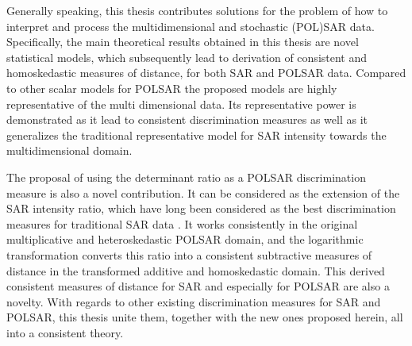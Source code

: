 Generally speaking, this thesis contributes solutions for the problem of how to interpret and process the multidimensional and stochastic (POL)SAR data.
Specifically, the
                main theoretical results obtained in this thesis are novel statistical
                models, which subsequently lead to derivation of
                consistent and homoskedastic measures of distance, for
                both SAR and POLSAR data.
Compared
                to other scalar models for POLSAR the proposed models
                are highly representative of the multi dimensional data.
Its
                representative power is demonstrated as it lead to
                consistent discrimination measures as well as it
                generalizes the traditional representative model for SAR
                intensity towards the multidimensional domain.

The proposal of using the determinant ratio as a POLSAR discrimination measure is also a novel contribution.
It can be considered as the extension of the SAR intensity ratio,
  which have long been considered as the best discrimination measures for traditional SAR data \cite{Rignot_1993_TGRS_896}.
It works consistently in the original multiplicative and heteroskedastic POLSAR domain,
  and the logarithmic transformation converts this ratio into a consistent subtractive measures of distance in the transformed additive and homoskedastic domain.
This
                derived consistent measures of distance for SAR and
                especially for POLSAR are also a novelty.
With regards to other existing discrimination measures for SAR and POLSAR,
                this thesis unite them, together with the new ones
                proposed herein, all into a consistent theory.

